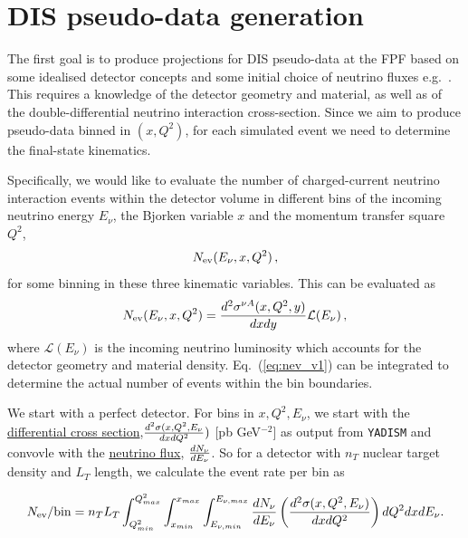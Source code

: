 \documentclass[11pt,a4paper]{article}
\def\frac#1#2{{{#1}\over {#2}}}
\numberwithin{equation}{section}
\numberwithin{figure}{section}
\numberwithin{table}{section}
\begin{document}
\section{DIS pseudo-data generation}

The first goal is to produce projections
for DIS pseudo-data at the FPF based on
some idealised detector concepts and
some initial choice of neutrino fluxes
e.g.~\cite{Kling:2021gos}.
%
This requires a knowledge of the detector geometry
and material, as well as of the double-differential
neutrino interaction cross-section. 
%
Since we aim to produce pseudo-data binned in $(x,Q^2)$,
for each simulated event we need to determine the 
final-state kinematics. 

Specifically, we would like to evaluate the
number of charged-current neutrino interaction events
within the detector volume in different bins
of the incoming neutrino energy $E_\nu$, the Bjorken
variable $x$ and the momentum transfer square $Q^2$,
\begin{equation}
    N_{\rm ev}(E_\nu, x, Q^2) \, ,
\end{equation}
for some binning in these three kinematic variables.
%
This can be evaluated as
\begin{equation}
\label{eq:nev_v1}
    N_{\rm ev}(E_\nu, x, Q^2) =  \frac{d^2\sigma^{\nu A}(x,Q^2,y)}{dxdy} \mathcal{L}(E_{\nu}) \, ,
\end{equation}
where $\mathcal{L}(E_{\nu}) $ is the incoming neutrino
luminosity which accounts for the detector geometry
and material density. 
%
Eq.~(\ref{eq:nev_v1}) can be integrated to
determine the actual number of events within
the bin boundaries.

\newline
\newline
We start with a perfect detector.
\newline
\newline
For bins in $x,Q^2,E_{\nu}$, we start with the \href{https://github.com/juanrojochacon/FPF-WG1/blob/main/results/diff_xsecs_a1.txt}{differential cross section},$\frac{d^2\sigma(x,Q^2,E_{\nu}}{dxdQ^2})$ [pb GeV$^{-2}$] as output from {\tt YADISM} and convovle with the \href{https://github.com/KlingFelix/FastNeutrinoFluxSimulation/tree/main/Fluxes}{neutrino flux}, $\frac{dN_{\nu}}{dE_{\nu}}$. So for a detector with $n_T$ nuclear target density and $L_T$ length, we calculate the event rate per bin as

\begin{equation}
    N_{\rm ev}/{\rm bin} = n_T L_T\int_{Q^2_{min}}^{Q^2_{max}}\int_{x_{min}}^{x_{max}}\int_{E_{\nu,min}}^{E_{\nu , max}} \frac{dN_{\nu}}{dE_{\nu}}\left(\frac{d^2\sigma(x,Q^2,E_{\nu})}{dxdQ^2}\right) dQ^2 dx dE_{\nu}.
\end{equation}
\end{document}

